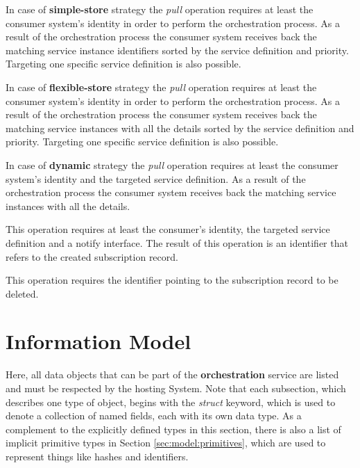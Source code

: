 \documentclass[a4paper]{arrowhead}
\begin{document}
In case of \textbf{simple-store} strategy the \textit{pull} operation requires at least the consumer system's identity in order to perform the orchestration process. As a result of the orchestration process the consumer system receives back the matching service instance identifiers sorted by the service definition and priority. Targeting one specific service definition is also possible.

In case of \textbf{flexible-store} strategy the \textit{pull} operation requires at least the consumer system's identity in order to perform the orchestration process. As a result of the orchestration process the consumer system receives back the matching service instances with all the details sorted by the service definition and priority. Targeting one specific service definition is also possible.

In case of \textbf{dynamic} strategy the \textit{pull} operation requires at least the consumer system's identity and the targeted service definition. As a result of the orchestration process the consumer system receives back the matching service instances with all the details.


This operation requires at least the consumer's identity, the targeted service definition and a notify interface. The result of this operation is an identifier that refers to the created subscription record. 


This operation requires the identifier pointing to the subscription record to be deleted.


\clearpage

\section{Information Model}
\label{sec:model}

Here, all data objects that can be part of the \textbf{orchestration} service are listed and must be respected by the hosting System.
Note that each subsection, which describes one type of object, begins with the \textit{struct} keyword, which is used to denote a collection of named fields, each with its own data type.
As a complement to the explicitly defined types in this section, there is also a list of implicit primitive types in Section \ref{sec:model:primitives}, which are used to represent things like hashes and identifiers.
\end{document}
